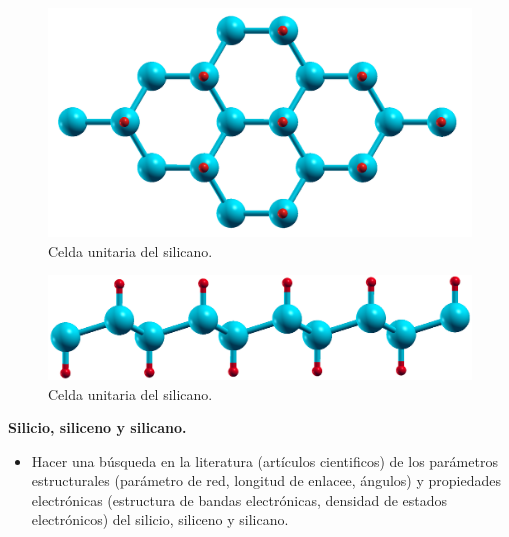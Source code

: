 \begin{frame}
    \begin{figure}[H]
        \centering
        \includegraphics[scale=0.2]{images_silicano/silicano_structure.png}
        \caption{Celda unitaria del silicano.}
    \end{figure}
\end{frame}

\begin{frame}
    \begin{figure}[H]
        \centering
        \includegraphics[scale=0.2]{images_silicano/silicano_structure_2.png}
        \caption{Celda unitaria del silicano.}
    \end{figure}
\end{frame}

\begin{frame}
    \textbf{ Silicio, siliceno y silicano.}

    \begin{itemize}
        \item Hacer una búsqueda en la literatura (artículos cientificos) de los parámetros 
            estructurales (parámetro de red, longitud de enlacee, ángulos) y propiedades
            electrónicas (estructura de bandas electrónicas, densidad de estados electrónicos)
            del silicio, siliceno y silicano.
    \end{itemize}
\end{frame}